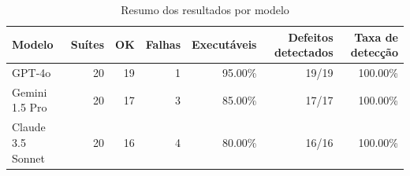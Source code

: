 \begin{table}[htbp]
\centering
\caption{Resumo dos resultados por modelo}
\label{tab:resumo-modelos}
\begin{tabular}{lrrrrrr}
\toprule
Modelo & Suítes & OK & Falhas & Executáveis & Defeitos detectados & Taxa de detecção \\
\midrule
GPT-4o & 20 & 19 & 1 & 95.00\% & 19/19 & 100.00\% \\
Gemini 1.5 Pro & 20 & 17 & 3 & 85.00\% & 17/17 & 100.00\% \\
Claude 3.5 Sonnet & 20 & 16 & 4 & 80.00\% & 16/16 & 100.00\% \\
\bottomrule
\end{tabular}
\end{table}
